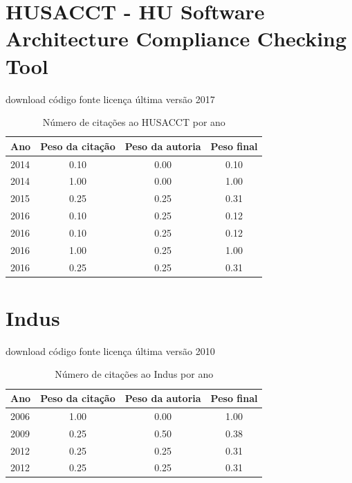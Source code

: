 \section{HUSACCT - HU Software Architecture Compliance Checking Tool}
\checkmark download
\checkmark código fonte
\checkmark licença
\checkmark última versão 2017
\begin{table}[H]
\caption{Número de citações ao HUSACCT  por ano}
\centering
\begin{tabular}{| l | c | c | c |}
  \hline
  Ano & Peso da citação & Peso da autoria & Peso final \\
  \hline
  2014
    & 0.10
    & 0.00
    & {\color{red} 0.10} \\
  2014
    & 1.00
    & 0.00
    & {\color{blue} 1.00} \\
\hline
  2015
    & 0.25
    & 0.25
    & {\color{red} 0.31} \\
\hline
  2016
    & 0.10
    & 0.25
    & {\color{red} 0.12} \\
  2016
    & 0.10
    & 0.25
    & {\color{red} 0.12} \\
  2016
    & 1.00
    & 0.25
    & {\color{blue} 1.00} \\
  2016
    & 0.25
    & 0.25
    & {\color{red} 0.31} \\
\hline
\end{tabular}
\end{table}
\section{Indus}
\checkmark download
\checkmark código fonte
\checkmark licença
\checkmark última versão 2010
\begin{table}[H]
\caption{Número de citações ao Indus por ano}
\centering
\begin{tabular}{| l | c | c | c |}
  \hline
  Ano & Peso da citação & Peso da autoria & Peso final \\
  \hline
  2006
    & 1.00
    & 0.00
    & {\color{blue} 1.00} \\
\hline
  2009
    & 0.25
    & 0.50
    & {\color{red} 0.38} \\
\hline
  2012
    & 0.25
    & 0.25
    & {\color{red} 0.31} \\
  2012
    & 0.25
    & 0.25
    & {\color{red} 0.31} \\
\hline
\end{tabular}
\end{table}
